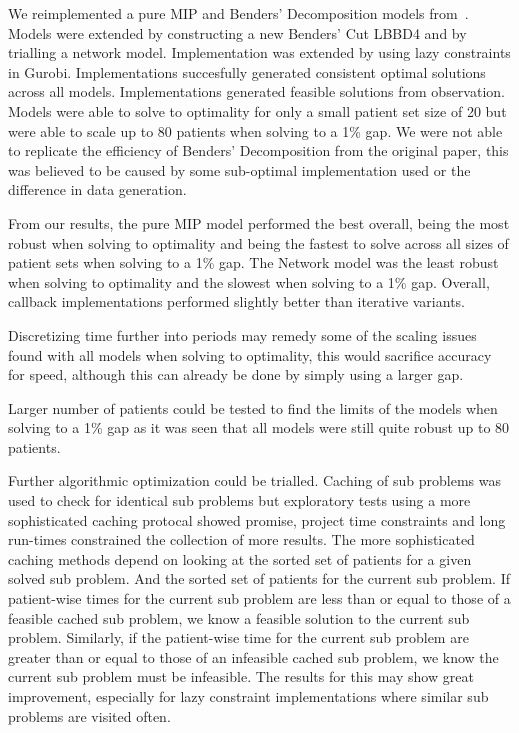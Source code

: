 We reimplemented a pure MIP and Benders' Decomposition models from~\cite{roshanaei2017propagating}. Models were extended by constructing a new Benders' Cut LBBD4 and by trialling a network model. Implementation was extended by using lazy constraints in Gurobi. Implementations succesfully generated consistent optimal solutions across all models. Implementations generated feasible solutions from observation. Models were able to solve to optimality for only a small patient set size of 20 but were able to scale up to 80 patients when solving to a 1\% gap. We were not able to replicate the efficiency of Benders' Decomposition from the original paper, this was believed to be caused by some sub-optimal implementation used or the difference in data generation.  

From our results, the pure MIP model performed the best overall, being the most robust when solving to optimality and being the fastest to solve across all sizes of patient sets when solving to a 1\% gap. The Network model was the least robust when solving to optimality and the slowest when solving to a 1\% gap. Overall, callback implementations performed slightly better than iterative variants.

Discretizing time further into periods may remedy some of the scaling issues found with all models when solving to optimality, this would sacrifice accuracy for speed, although this can already be done by simply using a larger gap. 

Larger number of patients could be tested to find the limits of the models when solving to a 1\% gap as it was seen that all models were still quite robust up to 80 patients. 

Further algorithmic optimization could be trialled. Caching of sub problems was used to check for identical sub problems but exploratory tests using a more sophisticated caching protocal showed promise, project time constraints and long run-times constrained the collection of more results. The more sophisticated caching methods depend on looking at the sorted set of patients for a given solved sub problem. And the sorted set of patients for the current sub problem. If patient-wise times for the current sub problem are less than or equal to those of a feasible cached sub problem, we know a feasible solution to the current sub problem. Similarly, if the patient-wise time for the current sub problem are greater than or equal to those of an infeasible cached sub problem, we know the current sub problem must be infeasible. The results for this may show great improvement, especially for lazy constraint implementations where similar sub problems are visited often.
